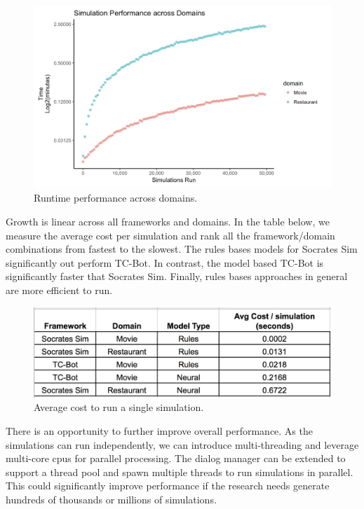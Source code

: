   \begin{figure}[h!]
 	\label{fig:perf_cd_test}
 	\includegraphics[width=\linewidth]{diagrams/domain_perf.jpeg}
 	\caption{ Runtime performance across domains.}
 \end{figure}

Growth is linear across all frameworks and domains. In the table below, we measure the average cost per simulation and rank all the framework/domain combinations from fastest to the slowest. The rules bases models for Socrates Sim significantly out perform TC-Bot. In contrast, the model based TC-Bot is significantly faster that Socrates Sim. Finally, rules bases approaches in general are more efficient to run. 

\begin{figure}[h!]
	\centering
	\includegraphics[width=\linewidth]{diagrams/avg_cost.jpeg}	
	\caption{ Average cost to run a single simulation.}
	\label{fig:avg_cost}
\end{figure}

 There is an opportunity to further improve overall performance. As the simulations can run independently, we can introduce multi-threading and leverage multi-core cpus for parallel processing. The dialog manager can be extended to support a thread pool and spawn multiple threads to run simulations in parallel. This could significantly improve performance if the research needs generate hundreds of thousands or millions of simulations.  

